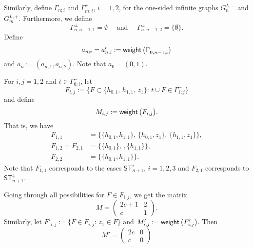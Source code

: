 \documentclass[11pt]{article}
\providecommand{\1}{\mathBB{1}}
\newcommand{\mbu}{\quad\mbox{ and }\quad}
\def\SPT{\mathsf{ST}}
\newcommand{\weight}{\mathop{\mbox{\sf weight}}}
\begin{document}
Similarly, define $\Gamma^-_{n;i}$ and $\Gamma^+_{m;i}$, $i=1,2$, for the one-sided infinite graphs $G^{L,-}_n$ and $G^{L,+}_m$. Furthermore, we define
$$\Gamma^\pm_{n,n-1;1}=\emptyset \mbu \Gamma^\pm_{n,n-1;2}=\{\emptyset\}.$$
Define
$$a_{n;i}=a^c_{n;i}:= \weight\big(\Gamma^-_{0,n-1;i}\big)$$
and $a_n:=(a_{n;1},a_{n;2})$. Note that $a_0=(0,1)$.

For $i,j=1,2$ and $t\in\Gamma^-_{0;i}$, let
\begin{equation}
\label{E2.12}
F_{i,j}:=\big\{F\subset\{h_{0,1},\,h_{1,1},\,z_{1}\}:\,t\cup F\in\Gamma^-_{1;j}\big\}
\end{equation}
and define
\begin{equation}
\label{E2.13}
M_{i,j}:=\weight\big(F_{i,j}\big).
\end{equation}
That is, we have
$$\begin{aligned}
F_{1,1}&=\big\{\{h_{0,1},h_{1,1}\},\,\{h_{0,1},z_1\},\,\{h_{1,1},z_1\}\big\},\\
F_{1,2}=F_{2,1}&=\big\{\{h_{0,1}\},\,,\{h_{1,1}\}\big\},\\
F_{2,2}&=\big\{\{h_{0,1},h_{1,1}\}\big\}.
\end{aligned}
$$
Note that $F_{1,1}$ corresponds to the cases $\SPT^i_{n+1}$, $i=1,2,3$ and $F_{2,1}$ corresponds to $\SPT^4_{n+1}$.


Going through all possibilities for $F\in F_{i,j}$, we get the matrix
\begin{equation}
\label{E2.14}
M=\left(
\begin{array}{cc}
2c+1& 2\\
c& 1
\end{array}
\right).
\end{equation}
Similarly, let
$F'_{i,j}:=\big\{F\in F_{i,j}:\,z_{1}\in F\big\}$
and
$M'_{i,j}:=\weight\big(F'_{i,j}\big)$.
Then
\begin{equation}
\label{E2.15}
M'=\left(
\begin{array}{cc}
2c& 0\\
c& 0
\end{array}
\right)
\end{equation}
\end{document}
